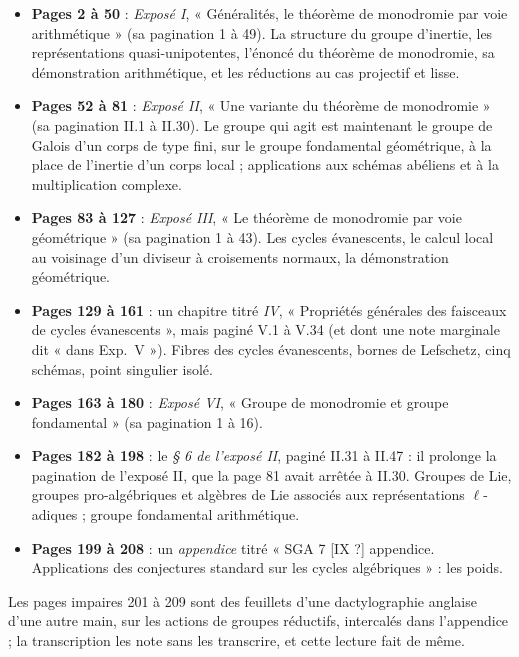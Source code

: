 \documentclass[11pt,a4paper]{article}
\begin{document}
\begin{itemize}
  \item \textbf{Pages 2 à 50} : \emph{Exposé I}, « Généralités, le théorème de
    monodromie par voie arithmétique » (sa pagination 1 à 49). La structure du
    groupe d'inertie, les représentations quasi-unipotentes, l'énoncé du
    théorème de monodromie, sa démonstration arithmétique, et les réductions
    au cas projectif et lisse.
  \item \textbf{Pages 52 à 81} : \emph{Exposé II}, « Une variante du théorème
    de monodromie » (sa pagination II.1 à II.30). Le groupe qui agit est
    maintenant le groupe de Galois d'un corps de type fini, sur
    le groupe fondamental géométrique, à la place de l'inertie d'un corps local ; applications aux schémas abéliens et à
    la multiplication complexe.
  \item \textbf{Pages 83 à 127} : \emph{Exposé III}, « Le théorème de
    monodromie par voie géométrique » (sa pagination 1 à 43). Les cycles
    évanescents, le calcul local au voisinage d'un diviseur à croisements
    normaux, la démonstration géométrique.
  \item \textbf{Pages 129 à 161} : un chapitre titré \emph{IV}, « Propriétés
    générales des faisceaux de cycles évanescents », mais paginé V.1 à V.34
    (et dont une note marginale dit « dans Exp.\ V »). Fibres des cycles
    évanescents, bornes de Lefschetz, cinq schémas, point singulier isolé.
  \item \textbf{Pages 163 à 180} : \emph{Exposé VI}, « Groupe de monodromie et
    groupe fondamental » (sa pagination 1 à 16).
  \item \textbf{Pages 182 à 198} : le \emph{§ 6 de l'exposé II}, paginé II.31
    à II.47 : il prolonge la pagination de l'exposé II, que la page 81 avait
    arrêtée à II.30. Groupes de Lie, groupes pro-algébriques et algèbres de Lie
    associés aux représentations $\ell$-adiques ; groupe fondamental
    arithmétique.
  \item \textbf{Pages 199 à 208} : un \emph{appendice} titré « SGA 7
    [IX ?] appendice. Applications des conjectures standard sur les cycles
    algébriques » : les poids.
\end{itemize}

Les pages impaires 201 à 209 sont des feuillets d'une dactylographie anglaise
d'une autre main, sur les actions de groupes réductifs, intercalés dans
l'appendice ; la transcription les note sans les transcrire, et cette lecture
fait de même.
\end{document}
